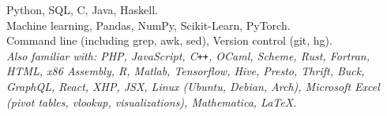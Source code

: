 \documentclass[10pt,letterpaper]{article}
\newcommand{\archive}[1]{}
\begin{document}
\noindent
%
Python, SQL, C, Java, Haskell. \\
%
Machine learning, Pandas, NumPy, Scikit-Learn, PyTorch.  \\
%
Command line (including grep, awk, sed), Version control (git, hg).\\


\noindent \textit{Also familiar with:
%
PHP, JavaScript, C}\verb!++!\textit{, OCaml, Scheme, Rust, Fortran,
%
HTML, x86 Assembly,
%
R, Matlab, Tensorflow,
%
Hive, Presto, Thrift, Buck, GraphQL, React, XHP, JSX,
%
Linux (Ubuntu, Debian, Arch),
%
Microsoft Excel (pivot tables, vlookup, visualizations), Mathematica, \LaTeX.
%
}
%
%

\archive{ %
Issue tracking (Jira), Code review (ReviewBoard)
C\verb!++!, Matlab
\LaTeX

Ballroom / Latin dance (...)
} %

\end{document}
